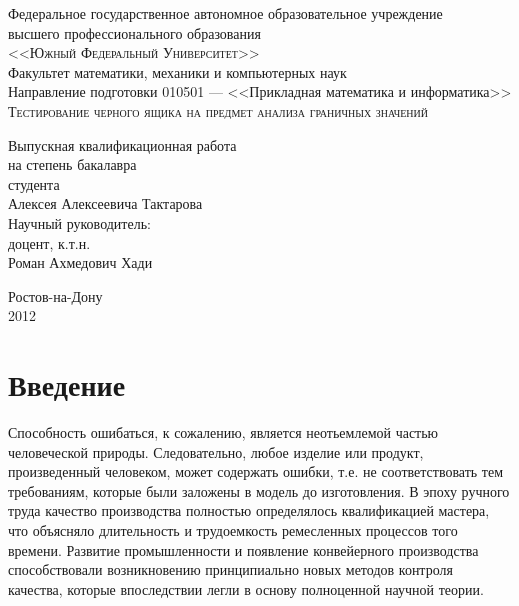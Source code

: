 \documentclass[a4paper,14pt,href]{article}
\begin{document}
\thispagestyle{empty}
\begin{center}
Федеральное государственное автономное образовательное учреждение \\
высшего профессионального образования \\ 
\textsc{<<Южный Федеральный Университет>>}\\[1.0cm]

Факультет математики, механики и компьютерных наук\\[1.0cm]

Направление подготовки 010501 --- <<Прикладная математика и информатика>>\\[3cm]

\textsc{Тестирование черного ящика на предмет анализа граничных значений}\\[3cm]

\begin{flushright}
   	Выпускная квалификационная работа \\
   	на степень бакалавра \\
   	студента \\
   	Алексея Алексеевича Тактарова \\[1.0cm]

   	Научный руководитель: \\
	доцент, к.т.н. \\
	Роман Ахмедович Хади
\end{flushright}

\vfill

	Ростов-на-Дону\\
	2012
\end{center}

\newpage
\tableofcontents

\newpage
\section*{Введение}

  Способность ошибаться, к сожалению, является неотьемлемой частью человеческой природы. Следовательно, любое изделие или продукт, произведенный человеком, может содержать ошибки, т.е. не соответствовать тем требованиям, которые были заложены в модель до изготовления. В эпоху ручного труда качество производства полностью определялось квалификацией мастера, что объясняло длительность и трудоемкость ремесленных процессов того времени. Развитие промышленности и появление конвейерного производства способствовали возникновению принципиально новых методов контроля качества, которые впоследствии легли в основу полноценной научной теории\cite{Ishikawa}.
  
\end{document}
